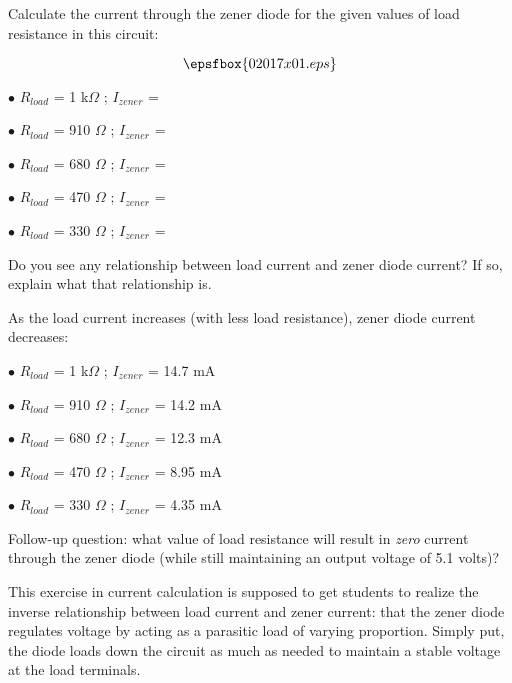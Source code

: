 

Calculate the current through the zener diode for the given values of load resistance in this circuit:

$$\epsfbox{02017x01.eps}$$

\medskip
\item{$\bullet$} $R_{load}$ = 1 k$\Omega$ ; $I_{zener}$ = 
\item{$\bullet$} $R_{load}$ = 910 $\Omega$ ; $I_{zener}$ =
\item{$\bullet$} $R_{load}$ = 680 $\Omega$ ; $I_{zener}$ =
\item{$\bullet$} $R_{load}$ = 470 $\Omega$ ; $I_{zener}$ =
\item{$\bullet$} $R_{load}$ = 330 $\Omega$ ; $I_{zener}$ =
\medskip

Do you see any relationship between load current and zener diode current?  If so, explain what that relationship is.







As the load current increases (with less load resistance), zener diode current decreases:

\medskip
\item{$\bullet$} $R_{load}$ = 1 k$\Omega$ ; $I_{zener}$ = 14.7 mA
\item{$\bullet$} $R_{load}$ = 910 $\Omega$ ; $I_{zener}$ = 14.2 mA
\item{$\bullet$} $R_{load}$ = 680 $\Omega$ ; $I_{zener}$ = 12.3 mA
\item{$\bullet$} $R_{load}$ = 470 $\Omega$ ; $I_{zener}$ = 8.95 mA
\item{$\bullet$} $R_{load}$ = 330 $\Omega$ ; $I_{zener}$ = 4.35 mA
\medskip

\vskip 10pt

Follow-up question: what value of load resistance will result in {\it zero} current through the zener diode (while still maintaining an output voltage of 5.1 volts)?







This exercise in current calculation is supposed to get students to realize the inverse relationship between load current and zener current: that the zener diode regulates voltage by acting as a parasitic load of varying proportion.  Simply put, the diode loads down the circuit as much as needed to maintain a stable voltage at the load terminals.

